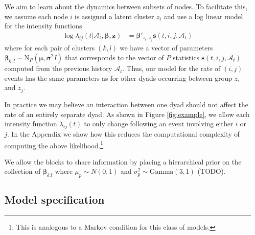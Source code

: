\documentclass{article}
\begin{document}
We aim to learn about the dynamics between subsets of nodes.   To facilitate this, we assume each node $i$ is assigned a latent cluster $z_i$ and use a log linear model for the intensity functions
\begin{align*}
\log \lambda_{ij}(t | \mathcal{A}_t,\mathbf{\beta},\mathbf{z}) &= \boldsymbol{\beta}'_{z_i,z_j} \mathbf{s}(t,i,j,\mathcal{A}_t)
\end{align*}
where for each pair of clusters $(k,l)$ we have a vector of parameters $\boldsymbol{\beta}_{k,l} \sim \mbox{N}_P(\boldsymbol{\mu},\boldsymbol{\sigma}^2I)$ that corresponds to the vector of $P$ statistics $\mathbf{s}(t,i,j,\mathcal{A}_t)$ computed from the previous history $\mathcal{A}_t$.  Thus, our model for the rate of $(i,j)$ events has the same parameters as for other dyads occurring between group $z_i$ and $z_j$.  

 In practice we may believe an interaction between one dyad should not affect the rate of an entirely separate dyad.  As shown in Figure \ref{fig:example}, we allow each intensity function $\lambda_{ij}(t)$ to only change following an event involving either $i$ or $j$.  In the Appendix we show how this reduces the computational complexity of computing the above likelihood.\footnote{This is analogous to a Markov condition for this class of models.}

We allow the blocks to share information by placing a hierarchical prior on the collection of $\boldsymbol{\beta}_{k.l}$ where $\mu_p \sim N(0,1)$ and $\sigma_p^2 \sim \mbox{Gamma}(3,1)$ (TODO). 

\subsection{Model specification}
  
\end{document}
